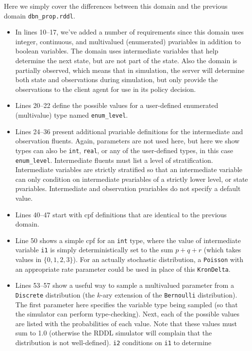 \documentclass[11pt,a4paper]{article}
\begin{document}
Here we simply cover the differences between this domain and the
previous domain \texttt{dbn\_prop.rddl}.
\begin{itemize}  
\item In lines 10--17, we've added a number of requirements since
this domain uses integer, continuous, and multivalued (enumerated)
pvariables in addition to boolean variables.  The domain uses
intermediate variables that help determine the next state, but are
not part of the state.  
Also the domain is partially observed,
which means that in simulation, the server will determine both
state and observations during simulation, but only provide the
observations to the client agent for use in its policy decision.
\item Lines 20--22 define the possible values for a user-defined
enumerated (multivalue) type named \texttt{enum\_level}.
\item Lines 24--36 present additional pvariable definitions for
the intermediate and observation fluents.  Again, parameters are not used
here, but here we show types can also be \texttt{int}, \texttt{real},
or any of the user-defined types, in this case \texttt{enum\_level}.
Intermediate fluents must list a level of stratification. 
Intermediate variables are 
strictly stratified so that an intermediate variable can only
condition on intermediate pvariables of a strictly lower level,
or state pvariables.  Intermediate and observation pvariables do not
specify a default value.
\item Lines 40--47 start with cpf definitions that are identical 
to the previous domain.
\item Line 50 shows a simple cpf for an \texttt{int} type, where the
value of intermediate variable \texttt{i1} is simply deterministically
set to the sum $p + q + r$ (which takes values in $\{0,1,2,3\}$).  For
an actually stochastic distribution, a \texttt{Poisson} with an
appropriate rate parameter could be used in place of this
\texttt{KronDelta}.
\item Lines 53--57 show a useful way to sample a multivalued parameter
from a \texttt{Discrete} distribution (the $k$-ary extension of the
\texttt{Bernoulli} distribution).  The first parameter here specifies
the variable type being sampled (so that the simulator can perform
type-checking).  Next, each of the possible values are listed with the
probabilities of each value.  Note that these values must sum to 1.0
(otherwise the RDDL simulator will complain that the distribution is
not well-defined).  \texttt{i2} conditions on \texttt{i1} to determine

\end{itemize}
\end{document}
